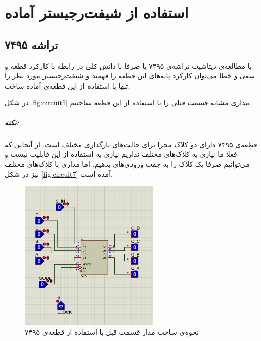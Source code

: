 \chapter{
استفاده از شیفت‌رجیستر آماده
}
\section{
تراشه ۷۴۹۵
}
با مطالعه‌ی دیتاشیت تراشه‌ی ۷۴۹۵
یا صرفا با دانش کلی در رابطه با کارکرد قطعه و سعی و خطا می‌توان کارکرد پایه‌های این قطعه را فهمید و شیفت‌رجیستر مورد نظر را تنها با استفاده از این قطعه‌ی آماده ساخت.

در شکل
\eqref{fig:circuit5}
مداری مشابه قسمت قبلی را با استفاده از این قطعه ساختیم.

\paragraph{نکته:}
قطعه‌ی ۷۴۹۵ دارای دو کلاک مجزا برای حالت‌های بارگذاری مختلف است.
از آنجایی که فعلا ما نیازی به کلاک‌های مختلف نداریم نیازی به استفاده از این قابلیت نیست و می‌توانیم صرفا یک کلاک را به جفت ورودی‌های بدهیم.
اما مداری با کلاک‌های مختلف نیز در شکل
\eqref{fig:circuit7}
آمده است.

\begin{figure}[h!]
    \centering
    \includegraphics[width=0.6\textwidth]{part2/5.png}
    \caption{
    نحوه‌ی ساخت مدار قسمت قبل با استفاده از قطعه‌ی ۷۴۹۵
    }
    \label{fig:circuit5}
\end{figure}



